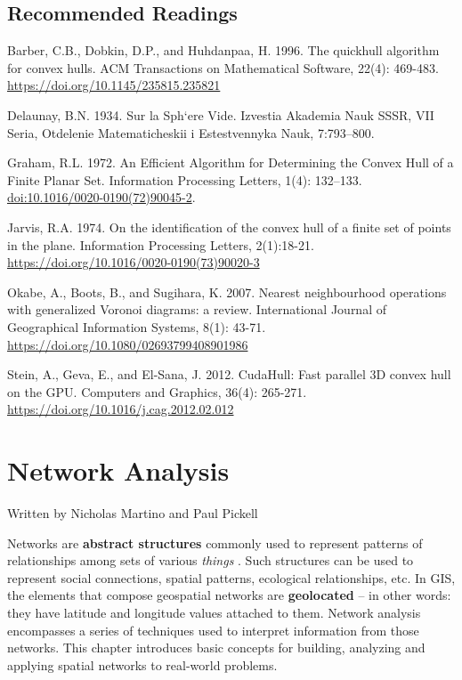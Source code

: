 \documentclass[
]{book}
\begin{document}
\section*{Recommended Readings}\label{recommended-readings}

Barber, C.B., Dobkin, D.P., and Huhdanpaa, H. 1996. The quickhull algorithm for convex hulls. ACM Transactions on Mathematical Software, 22(4): 469-483. \url{https://doi.org/10.1145/235815.235821}

Delaunay, B.N. 1934. Sur la Sph`ere Vide. Izvestia Akademia Nauk SSSR, VII Seria, Otdelenie
Matematicheskii i Estestvennyka Nauk, 7:793--800.

Graham, R.L. 1972. An Efficient Algorithm for Determining the Convex Hull of a Finite Planar Set. Information Processing Letters, 1(4): 132--133. \url{doi:10.1016/0020-0190(72)90045-2}.

Jarvis, R.A. 1974. On the identification of the convex hull of a finite set of points in the plane. Information Processing Letters, 2(1):18-21. \url{https://doi.org/10.1016/0020-0190(73)90020-3}

Okabe, A., Boots, B., and Sugihara, K. 2007. Nearest neighbourhood operations with generalized Voronoi diagrams: a review. International Journal of Geographical Information Systems, 8(1): 43-71. \url{https://doi.org/10.1080/02693799408901986}

Stein, A., Geva, E., and El-Sana, J. 2012. CudaHull: Fast parallel 3D convex hull on the GPU. Computers and Graphics, 36(4): 265-271. \url{https://doi.org/10.1016/j.cag.2012.02.012}

\chapter{Network Analysis}\label{network-analysis}

Written by
Nicholas Martino and Paul Pickell

Networks are \textbf{abstract structures} commonly used to represent patterns of relationships among sets of various \emph{things} \citep{ajorlou_introduction_2018}. Such structures can be used to represent social connections, spatial patterns, ecological relationships, etc. In GIS, the elements that compose geospatial networks are \textbf{geolocated} -- in other words: they have latitude and longitude values attached to them. Network analysis encompasses a series of techniques used to interpret information from those networks. This chapter introduces basic concepts for building, analyzing and applying spatial networks to real-world problems.
\end{document}
